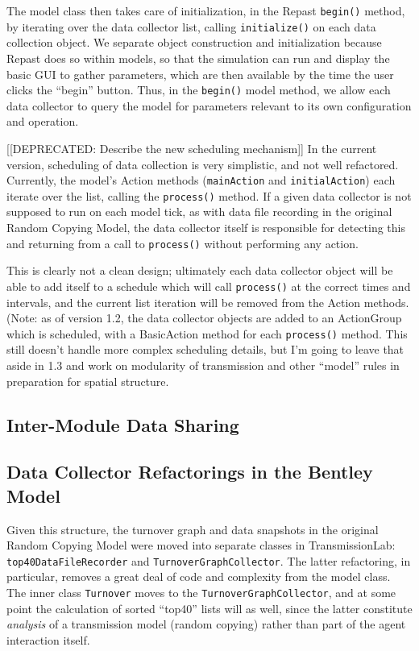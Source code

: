\documentclass{kluwer-mem-copyright}
\begin{document}
\begin{article}
The model class then takes care of initialization, in the Repast
 \texttt{begin()} method, by iterating over the data collector list, calling
\texttt{initialize()} on each data collection object.  We separate object
construction and initialization because Repast does so within models, so that
the simulation can run and display the basic GUI to gather parameters,
which are then available by the time the user clicks the ``begin'' button. 
Thus, in the \texttt{begin()} model method, we allow each data collector to
query the model for parameters relevant to its own configuration and operation.

[[DEPRECATED:  Describe the new scheduling mechanism]]
In the current version, scheduling of data collection is very simplistic, and
not well refactored.  Currently, the model's Action methods (\texttt{mainAction}
and \texttt{initialAction}) each iterate over the list, calling the
\texttt{process()} method.  If a given data collector is not supposed to run on
each model tick, as with data file recording in the original Random Copying
Model, the data collector itself is responsible for detecting this and returning
from a call to \texttt{process()} without performing any action.  

This is clearly not a clean design; ultimately each data collector object will
be able to add itself to a schedule which will call \texttt{process()} at the
correct times and intervals, and the current list iteration will be removed from
the Action methods. (Note:  as of version 1.2, the data collector objects are
added to an ActionGroup which is scheduled, with a BasicAction method for each
\texttt{process()} method.  This still doesn't handle more complex scheduling
details, but I'm going to leave that aside in 1.3 and work on modularity of 
transmission and other ``model'' rules in preparation for spatial structure.  

\subsection{Inter-Module Data Sharing}


\subsection{Data Collector Refactorings in the Bentley Model}
Given this structure, the turnover graph and data snapshots in the original
Random
Copying Model were moved into separate classes in TransmissionLab:\\  \texttt{top40DataFileRecorder}
and \texttt{TurnoverGraphCollector}.  The latter refactoring, in particular,
removes a great deal of code and complexity from the model class. 
The inner class \texttt{Turnover} moves to the \texttt{TurnoverGraphCollector},
and at some point the calculation of sorted ``top40'' lists will as well, since
the latter constitute \emph{analysis} of a transmission model (random copying)
rather than part of the agent interaction itself.


\end{article}
\end{document}
